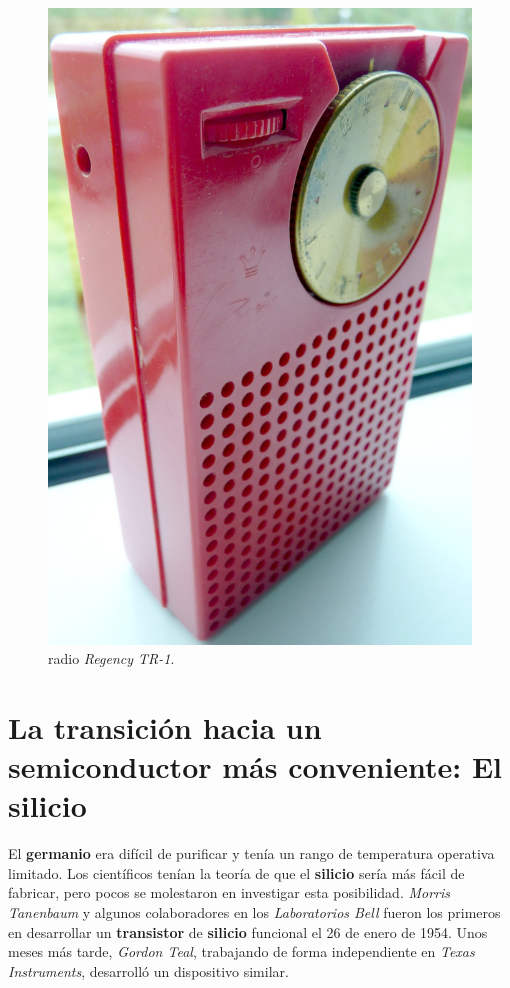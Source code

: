 \begin{figure}[htb]
	\centering
	\includegraphics[scale = 0.2]{Graphics/Regency_TR-1_radio.jpg}
	\caption{radio \emph{Regency TR-1}.}
	\label{fig:4}
\end{figure}
\newpage

\section{La transición hacia un semiconductor más conveniente: El silicio}
El \textbf{germanio} era difícil de purificar y tenía un rango de temperatura operativa limitado. Los científicos tenían la teoría de que el \textbf{silicio}
sería más fácil de fabricar, pero pocos se molestaron en investigar esta posibilidad. \emph{Morris Tanenbaum} y algunos colaboradores en los \emph{Laboratorios Bell}
fueron los primeros en desarrollar un \textbf{transistor} de \textbf{silicio} funcional el 26 de enero de 1954. Unos meses más tarde, \emph{Gordon Teal}, trabajando
de forma independiente en \emph {Texas Instruments}, desarrolló un dispositivo similar.\\

